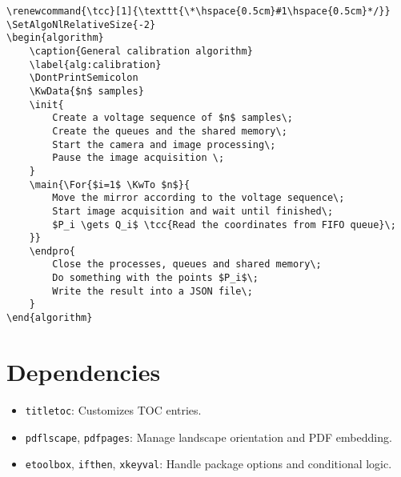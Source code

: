 \documentclass[12pt,twoside]{report}
\begin{document}
\begin{algorithm}
    \caption{General calibration algorithm}
    \label{alg:calibration}
    \DontPrintSemicolon


    
\end{algorithm}
\begin{verbatim}
\renewcommand{\tcc}[1]{\texttt{\*\hspace{0.5cm}#1\hspace{0.5cm}*/}}
\SetAlgoNlRelativeSize{-2}
\begin{algorithm}
    \caption{General calibration algorithm}
    \label{alg:calibration}
    \DontPrintSemicolon
    \KwData{$n$ samples}
    \init{
        Create a voltage sequence of $n$ samples\;
        Create the queues and the shared memory\;
        Start the camera and image processing\; 
        Pause the image acquisition \;
    }
    \main{\For{$i=1$ \KwTo $n$}{
        Move the mirror according to the voltage sequence\;
        Start image acquisition and wait until finished\;
        $P_i \gets Q_i$ \tcc{Read the coordinates from FIFO queue}\;
    }}
    \endpro{
        Close the processes, queues and shared memory\;
        Do something with the points $P_i$\;
        Write the result into a JSON file\;
    }
\end{algorithm}  
\end{verbatim}
\section{Dependencies}
\begin{itemize}
    \item \texttt{titletoc}: Customizes TOC entries.
    \item \texttt{pdflscape}, \texttt{pdfpages}: Manage landscape orientation and PDF embedding.
    \item \texttt{etoolbox}, \texttt{ifthen}, \texttt{xkeyval}: Handle package options and conditional logic.
\end{itemize}
\end{document}
